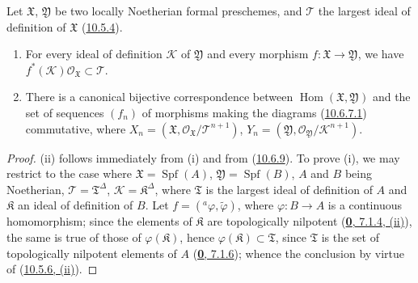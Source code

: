 \begin{corollary}[10.6.10]
\label{I.10.6.10}
Let $\mathfrak{X}$, $\mathfrak{Y}$ be two locally Noetherian formal
preschemes, and $\mathscr{T}$ the largest ideal of definition
of $\mathfrak{X}$ \textup{(\hyperref[I.10.5.4]{10.5.4})}.
\begin{enumerate}
  \item[\rm{(i)}] For every ideal of definition $\mathscr{K}$ of
  $\mathfrak{Y}$ and every morphism
  $f:\mathfrak{X}\to\mathfrak{Y}$, we have
  $f^*(\mathscr{K})\mathscr{O}_{\mathfrak{X}}\subset\mathscr{T}$.
  \item[\rm{(ii)}] There is a canonical bijective correspondence between
  $\operatorname{Hom}(\mathfrak{X},\mathfrak{Y})$ and the set of
  sequences $(f_n)$ of morphisms making the diagrams
  \textup{(\hyperref[I.10.6.7.1]{10.6.7.1})} commutative, where
  $X_n=(\mathfrak{X},
  \mathscr{O}_{\mathfrak{X}}/\mathscr{T}^{n+1})$,
  $Y_n=(\mathfrak{Y},
  \mathscr{O}_{\mathfrak{Y}}/\mathscr{K}^{n+1})$.
\end{enumerate}
\end{corollary}

\begin{proof}
(ii) follows immediately from (i) and from
(\hyperref[I.10.6.9]{10.6.9}). To prove (i), we may restrict
to the case where $\mathfrak{X}=\operatorname{Spf}(A)$,
$\mathfrak{Y}=\operatorname{Spf}(B)$, $A$ and $B$ being Noetherian,
$\mathscr{T}=\mathfrak{T}^\Delta$,
$\mathscr{K}=\mathfrak{K}^\Delta$, where $\mathfrak{T}$ is the largest
ideal of definition of $A$ and $\mathfrak{K}$ an ideal of definition of
$B$. Let $f=({}^a\varphi,\widetilde{\varphi})$, where
$\varphi:B\to A$ is a continuous homomorphism; since the elements of
$\mathfrak{K}$ are topologically nilpotent
(\hyperref[0.7.1.4]{\textbf{0}, 7.1.4, (ii)}), the same is true of those of
$\varphi(\mathfrak{K})$, hence
$\varphi(\mathfrak{K})\subset\mathfrak{T}$, since $\mathfrak{T}$ is
the set of topologically nilpotent elements of $A$
(\hyperref[0.7.1.6]{\textbf{0}, 7.1.6}); whence the conclusion by virtue of
(\hyperref[I.10.5.6]{10.5.6, (ii)}).
\end{proof}

